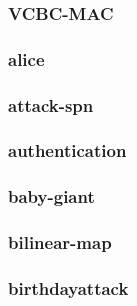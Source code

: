 \begin{frame}\frametitle{VCBC-MAC}
\begin{figure}
\begin{center}

\end{center}
\end{figure}
\end{frame}
\begin{frame}\frametitle{alice}
\begin{figure}
\begin{center}

\end{center}
\end{figure}
\end{frame}
\begin{frame}\frametitle{attack-spn}
\begin{figure}
\begin{center}

\end{center}
\end{figure}
\end{frame}
\begin{frame}\frametitle{authentication}
\begin{figure}
\begin{center}

\end{center}
\end{figure}
\end{frame}
\begin{frame}\frametitle{baby-giant}
\begin{figure}
\begin{center}

\end{center}
\end{figure}
\end{frame}
\begin{frame}\frametitle{bilinear-map}
\begin{figure}
\begin{center}

\end{center}
\end{figure}
\end{frame}
\begin{frame}\frametitle{birthdayattack}
\begin{figure}
\begin{center}

\end{center}
\end{figure}
\end{frame}
